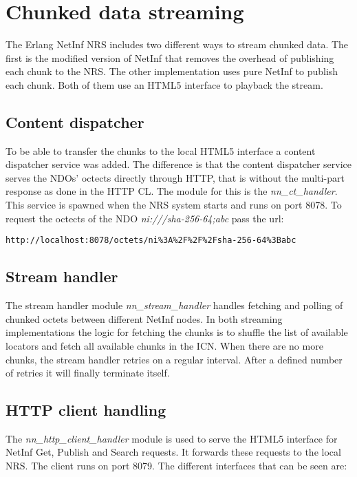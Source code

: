 \section{Chunked data streaming}
\label{sec:Chunkeddata}
The Erlang NetInf NRS includes two different ways to stream chunked data. The first is the modified version of NetInf that removes the overhead of publishing each chunk to the NRS. The other implementation uses pure NetInf to publish each chunk. Both of them use an HTML5 interface to playback the stream. 


\subsection{Content dispatcher}

To be able to transfer the chunks to the local HTML5 interface a content dispatcher service was added. The difference is that the content dispatcher service serves the NDOs' octects directly through HTTP, that is without the multi-part response as done in the HTTP CL. The module for this is the \textit{nn\_ct\_handler}. This service is spawned when the NRS system starts and runs on port 8078. To request the octects of the NDO \textit{ni:///sha-256-64;abc} pass the url:
\begin{verbatim}
http://localhost:8078/octets/ni%3A%2F%2F%2Fsha-256-64%3Babc 
\end{verbatim}

\subsection{Stream handler}
The stream handler module \textit{nn\_stream\_handler} handles fetching and polling of chunked octets between different NetInf nodes.
In both streaming implementations the logic for fetching the chunks is to shuffle the list of available locators and fetch all available chunks in the ICN. When there are no more chunks, the stream handler retries on a regular interval. After a defined number of retries it will finally terminate itself.  

\subsection{HTTP client handling}
The \textit{nn\_http\_client\_handler} module is used to serve the HTML5 interface for NetInf Get, Publish and Search requests. It forwards these requests to the local NRS. The client runs on port 8079. The different interfaces that can be seen are:

